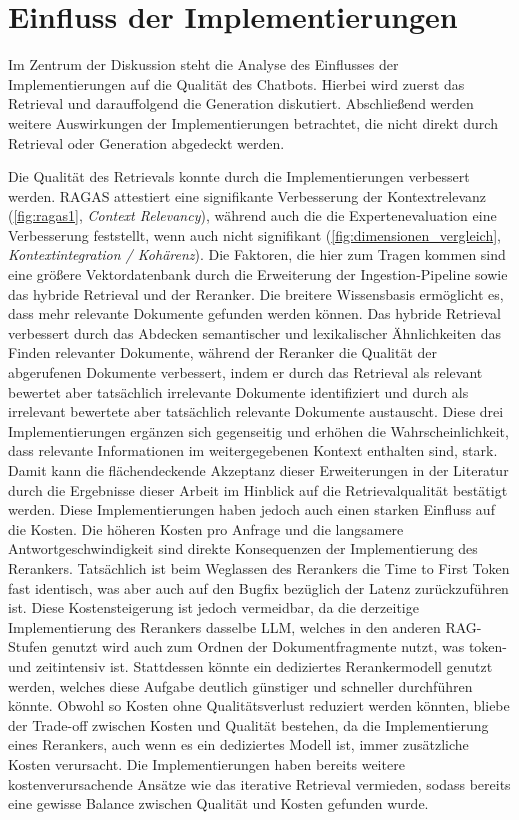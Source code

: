 \section{Einfluss der Implementierungen}
Im Zentrum der Diskussion steht die Analyse des Einflusses der Implementierungen auf die Qualität des Chatbots. Hierbei wird zuerst das Retrieval und darauffolgend die Generation diskutiert. Abschließend werden weitere Auswirkungen der Implementierungen betrachtet, die nicht direkt durch Retrieval oder Generation abgedeckt werden.

Die Qualität des Retrievals konnte durch die Implementierungen verbessert werden. RAGAS attestiert eine signifikante Verbesserung der Kontextrelevanz (\autoref{fig:ragas1}, \textit{Context Relevancy}), während auch die die Expertenevaluation eine Verbesserung feststellt, wenn auch nicht signifikant (\autoref{fig:dimensionen_vergleich}, \textit{Kontextintegration / Kohärenz}). Die Faktoren, die hier zum Tragen kommen sind eine größere Vektordatenbank durch die Erweiterung der Ingestion-Pipeline sowie das hybride Retrieval und der Reranker. Die breitere Wissensbasis ermöglicht es, dass mehr relevante Dokumente gefunden werden können. Das hybride Retrieval verbessert durch das Abdecken semantischer und lexikalischer Ähnlichkeiten das Finden relevanter Dokumente, während der Reranker die Qualität der abgerufenen Dokumente verbessert, indem er durch das Retrieval als relevant bewertet aber tatsächlich irrelevante Dokumente identifiziert und durch als irrelevant bewertete aber tatsächlich relevante Dokumente austauscht. Diese drei Implementierungen ergänzen sich gegenseitig und erhöhen die Wahrscheinlichkeit, dass relevante Informationen im weitergegebenen Kontext enthalten sind, stark. Damit kann die flächendeckende Akzeptanz dieser Erweiterungen in der Literatur durch die Ergebnisse dieser Arbeit im Hinblick auf die Retrievalqualität bestätigt werden. Diese Implementierungen haben jedoch auch einen starken Einfluss auf die Kosten. Die höheren Kosten pro Anfrage und die langsamere Antwortgeschwindigkeit sind direkte Konsequenzen der Implementierung des Rerankers. Tatsächlich ist beim Weglassen des Rerankers die Time to First Token fast identisch, was aber auch auf den Bugfix bezüglich der Latenz zurückzuführen ist. Diese Kostensteigerung ist jedoch vermeidbar, da die derzeitige Implementierung des Rerankers dasselbe LLM, welches in den anderen RAG-Stufen genutzt wird auch zum Ordnen der Dokumentfragmente nutzt, was token- und zeitintensiv ist. Stattdessen könnte ein dediziertes Rerankermodell genutzt werden, welches diese Aufgabe deutlich günstiger und schneller durchführen könnte. Obwohl so Kosten ohne Qualitätsverlust reduziert werden könnten, bliebe der Trade-off zwischen Kosten und Qualität bestehen, da die Implementierung eines Rerankers, auch wenn es ein dediziertes Modell ist, immer zusätzliche Kosten verursacht. Die Implementierungen haben bereits weitere kostenverursachende Ansätze wie das iterative Retrieval vermieden, sodass bereits eine gewisse Balance zwischen Qualität und Kosten gefunden wurde.


